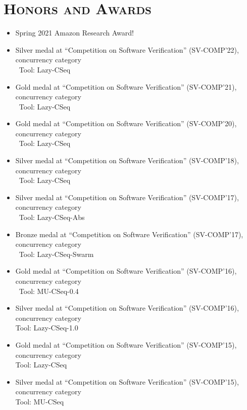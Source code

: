 \begin{resume}
\begin{itemize}
\end{itemize}




\section{\bfseries \scshape  Honors and Awards}
\begin{itemize}
   \item Spring 2021 Amazon Research Award!
   \item  Silver medal at ``Competition on Software Verification'' (SV-COMP'22), concurrency category\\\
    Tool:  Lazy-CSeq
   \item  Gold medal at ``Competition on Software Verification'' (SV-COMP'21), concurrency category\\\
    Tool:  Lazy-CSeq
   \item  Gold medal at ``Competition on Software Verification'' (SV-COMP'20), concurrency category\\\
    Tool:  Lazy-CSeq
   \item  Silver medal at ``Competition on Software Verification'' (SV-COMP'18), concurrency category\\\
    Tool:  Lazy-CSeq

   \item  Silver medal at ``Competition on Software Verification'' (SV-COMP'17), concurrency category\\\
    Tool:  Lazy-CSeq-Abs

   \item  Bronze medal at ``Competition on Software Verification''  (SV-COMP'17), concurrency category\\\
    Tool:  Lazy-CSeq-Swarm 


   \item  Gold medal at ``Competition on Software Verification''  (SV-COMP'16), concurrency category\\\
    Tool: MU-CSeq-0.4

   \item Silver medal at ``Competition on Software Verification''  (SV-COMP'16), concurrency category\\
    Tool: Lazy-CSeq-1.0

   \item Gold medal at ``Competition on Software Verification''  (SV-COMP'15), concurrency category\\
    Tool: Lazy-CSeq
   \item Silver medal at ``Competition on Software Verification''  (SV-COMP'15), concurrency category\\
    Tool: MU-CSeq


\end{itemize}
\end{resume}
